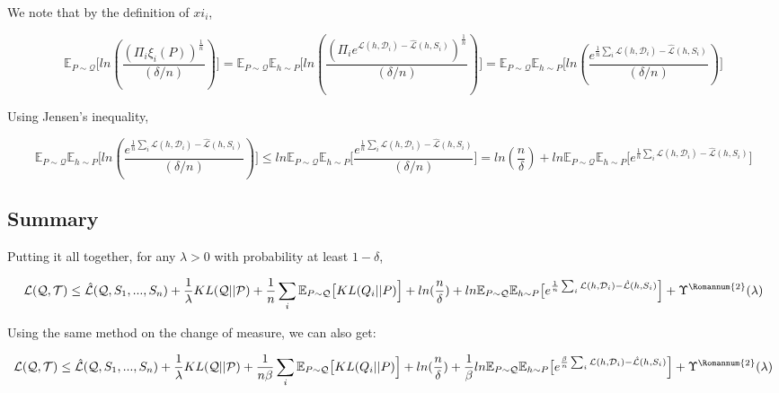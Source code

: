 \documentclass[letterpaper]{article}
\theoremstyle{definition}
\begin{document}
We note that by the definition of $xi_i$,

$$\mathbb{E}_{P\sim \mathcal{Q}} \bigl [ ln(\frac{(\Pi_i\xi_i(P))^{\frac{1}{n}}}{(\delta/n)}) \Bigr ] = 
\mathbb{E}_{P\sim \mathcal{Q}} \mathbb{E}_{h\sim P} \bigl [ ln(\frac{(\Pi_i e^{\mathcal{L}(h, \mathcal{D}_i)- \hat{\mathcal{L}}(h, S_i)})^{\frac{1}{n}}}{(\delta/n)}) \Bigr ] = 
\mathbb{E}_{P\sim \mathcal{Q}} \mathbb{E}_{h\sim P} \bigl [ ln(\frac{ e^{\frac{1}{n}\sum_i\mathcal{L}(h, \mathcal{D}_i)- \hat{\mathcal{L}}(h, S_i)}}{(\delta/n)}) \Bigr ]$$

Using Jensen's inequality,

$$\mathbb{E}_{P\sim \mathcal{Q}} \mathbb{E}_{h\sim P} \bigl [ ln(\frac{ e^{\frac{1}{n}\sum_i\mathcal{L}(h, \mathcal{D}_i)- \hat{\mathcal{L}}(h, S_i)}}{(\delta/n)}) \Bigr ] \leq ln \mathbb{E}_{P\sim \mathcal{Q}} \mathbb{E}_{h\sim P} \bigl [ \frac{ e^{\frac{1}{n}\sum_i\mathcal{L}(h, \mathcal{D}_i)- \hat{\mathcal{L}}(h, S_i)}}{(\delta/n)} \Bigr ] = ln(\frac{n}{\delta})+ ln \mathbb{E}_{P\sim \mathcal{Q}} \mathbb{E}_{h\sim P} \bigl [ e^{\frac{1}{n}\sum_i\mathcal{L}(h, \mathcal{D}_i)- \hat{\mathcal{L}}(h, S_i)} \Bigr ]$$

\subsection{Summary}

Putting it all together, for any $\lambda>0$ with probability at least $1-\delta$,

$$\mathcal{L}(\mathcal{Q}, \mathcal{T}) \leq \hat{\mathcal{L}}(\mathcal{Q}, S_1,...,S_n) + \frac{1}{\lambda} KL(\mathcal{Q}||\mathcal{P}) + \frac{1}{n}\sum_i \mathbb{E}_{P\sim \mathcal{Q}} \bigl [KL(Q_i||P) \Bigr ] + ln(\frac{n}{\delta})+ ln \mathbb{E}_{P\sim \mathcal{Q}} \mathbb{E}_{h\sim P} \bigl [ e^{\frac{1}{n}\sum_i\mathcal{L}(h, \mathcal{D}_i)- \hat{\mathcal{L}}(h, S_i)} \Bigr ] +\Upsilon^{\text{\Romannum{2}}}(\lambda)$$

Using the same method on the change of measure, we can also get:

$$\mathcal{L}(\mathcal{Q}, \mathcal{T}) \leq \hat{\mathcal{L}}(\mathcal{Q}, S_1,...,S_n) + \frac{1}{\lambda} KL(\mathcal{Q}||\mathcal{P}) + \frac{1}{n\beta}\sum_i \mathbb{E}_{P\sim \mathcal{Q}} \bigl [KL(Q_i||P) \Bigr ] + ln(\frac{n}{\delta})+ \frac{1}{\beta}ln \mathbb{E}_{P\sim \mathcal{Q}} \mathbb{E}_{h\sim P} \bigl [ e^{\frac{\beta}{n}\sum_i\mathcal{L}(h, \mathcal{D}_i)- \hat{\mathcal{L}}(h, S_i)} \Bigr ] +\Upsilon^{\text{\Romannum{2}}}(\lambda)$$
\end{document}
